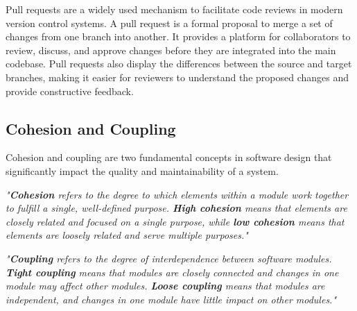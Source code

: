 Pull requests are a widely used mechanism to facilitate code reviews in modern version control systems. A pull request is a formal proposal to merge a set of changes from one branch into another. It provides a platform for collaborators to review, discuss, and approve changes before they are integrated into the main codebase. Pull requests also display the differences between the source and target branches, making it easier for reviewers to understand the proposed changes and provide constructive feedback. \cite{github:pr}

\subsection{Cohesion and Coupling}
\label{subsec:cohesion-and-coupling}

Cohesion and coupling are two fundamental concepts in software design that significantly impact the quality and maintainability of a system. \\

\begin{center}
\textit{"\textbf{Cohesion} refers to the degree to which elements within a module work together to fulfill a single, well-defined purpose. \textbf{High cohesion} means that elements are closely related and focused on a single purpose, while \textbf{low cohesion} means that elements are loosely related and serve multiple purposes."} \cite{geeksforgeeks:c&c} \\
\end{center}

\begin{center}
\textit{"\textbf{Coupling} refers to the degree of interdependence between software modules. \textbf{Tight coupling} means that modules are closely connected and changes in one module may affect other modules. \textbf{Loose coupling} means that modules are independent, and changes in one module have little impact on other modules."} \cite{geeksforgeeks:c&c} \\
\end{center}

